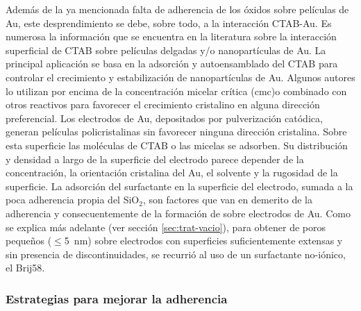 			Además de la ya mencionada falta de adherencia de los óxidos sobre películas de Au, este desprendimiento se debe, sobre todo, a la interacción CTAB-Au. Es numerosa la información que se encuentra en la literatura sobre la interacción superficial de CTAB sobre películas delgadas y/o nanopartículas de Au. La principal aplicación se basa en la adsorción y autoensamblado del CTAB para controlar el crecimiento y estabilización de nanopartículas de Au. \cite{Cheng2003,Smith2008,Meena2013,Wang2013,Hamon2009} Algunos autores lo utilizan por encima de la concentración micelar crítica (cmc)\cite{Lim2014}o combinado con otros reactivos para favorecer el crecimiento cristalino en alguna dirección preferencial\cite{Smith2009}. Los electrodos de Au, depositados por pulverización catódica, generan películas policristalinas sin favorecer ninguna dirección cristalina.\cite{Svorcik2010,Bechelany2010} Sobre esta superficie las moléculas de CTAB o las micelas se adsorben. Su distribución y densidad a largo de la superficie del electrodo parece depender de la concentración, la orientación cristalina del Au, el solvente y la rugosidad de la superficie\cite{Meena2013,Lim2014}. La adsorción del surfactante en la superficie del electrodo, sumada a la poca adherencia propia del SiO$_2$, son factores que van en demerito de la adherencia y consecuentemente de la formación de \pdmC\space sobre electrodos de Au. %
			Como se explica más adelante (ver sección \ref{sec:trat-vacio}), para obtener \pdm\space de poros pequeños ($\leq$\SI{5}{\nm}) sobre electrodos con superficies suficientemente extensas y sin presencia de discontinuidades, se recurrió al uso de un surfactante no-iónico, el Brij58\index{Brij58}.
							
		\subsubsection{Estrategias para mejorar la adherencia}\label{sec:adherencia}

